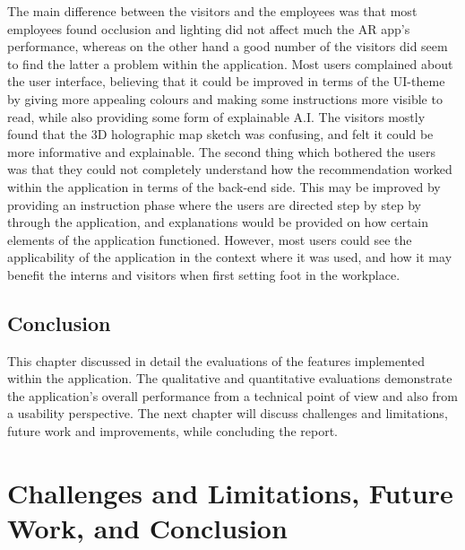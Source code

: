 \documentclass{aifyp}
\begin{document}
\indent The main difference between the visitors and the employees was that most employees found occlusion and lighting did not affect much the AR app's performance, whereas on the other hand a good number of the visitors did seem to find the latter a problem within the application. Most users complained about the user interface, believing that it could be improved in terms of the UI-theme by giving more appealing colours and making some instructions more visible to read, while also providing some form of explainable A.I. The visitors mostly found that the 3D holographic map sketch was confusing, and felt it could be more informative and explainable. The second thing which bothered the users was that they could not completely understand how the recommendation worked within the application in terms of the back-end side. This may be improved by providing an instruction phase where the users are directed step by step by through the application, and explanations would be provided on how certain elements of the application functioned. However, most users could see the applicability of the application in the context where it was used, and how it may benefit the interns and visitors when first setting foot in the workplace. 

\subsection{Conclusion}
This chapter discussed in detail the evaluations of the features implemented within the application. The qualitative and quantitative evaluations demonstrate the application's overall performance from a technical point of view and also from a usability perspective. The next chapter will discuss challenges and limitations, future work and improvements, while concluding the report.

\newpage
\section{Challenges and Limitations, Future Work, and Conclusion}
\end{document}
